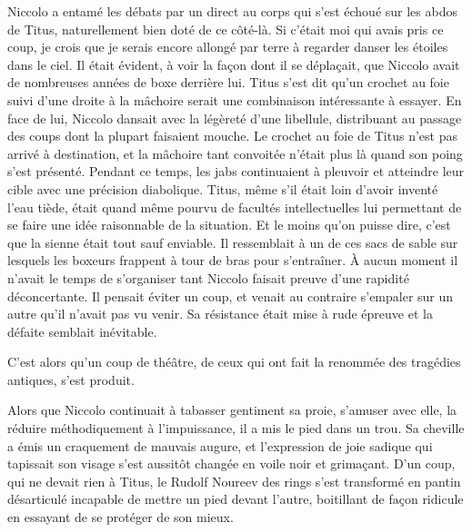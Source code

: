 Niccolo a entamé les débats par un direct au corps qui s’est échoué sur les abdos de Titus, naturellement bien doté de ce côté-là. Si c’était moi qui avais pris ce coup, je crois que je serais encore allongé par terre à regarder danser les étoiles dans le ciel. Il était évident, à voir la façon dont il se déplaçait, que Niccolo avait de nombreuses années de boxe derrière lui. Titus s’est dit qu’un crochet au foie suivi d’une droite à la mâchoire serait une combinaison intéressante à essayer. En face de lui, Niccolo dansait avec la légèreté d’une libellule, distribuant au passage des coups dont la plupart faisaient mouche. Le crochet au foie de Titus n’est pas arrivé à destination, et la mâchoire tant convoitée n’était plus là quand son poing s’est présenté. Pendant ce temps, les jabs continuaient à pleuvoir et atteindre leur cible avec une précision diabolique. Titus, même s’il était loin d’avoir inventé l’eau tiède, était quand même pourvu de facultés intellectuelles lui permettant de se faire une idée raisonnable de la situation. Et le moins qu’on puisse dire, c’est que la sienne était tout sauf enviable. Il ressemblait à un de ces sacs de sable sur lesquels les boxeurs frappent à tour de bras pour s’entraîner. À aucun moment il n’avait le temps de s’organiser tant Niccolo faisait preuve d’une rapidité déconcertante. Il pensait éviter un coup, et venait au contraire s’empaler sur un autre qu’il n’avait pas vu venir. Sa résistance était mise à rude épreuve et la défaite semblait inévitable.

C’est alors qu’un coup de théâtre, de ceux qui ont fait la renommée des tragédies antiques, s’est produit.

Alors que Niccolo continuait à tabasser gentiment sa proie, s’amuser avec elle, la réduire méthodiquement à l’impuissance, il a mis le pied dans un trou. Sa cheville a émis un craquement de mauvais augure, et l’expression de joie sadique qui tapissait son visage s’est aussitôt changée en voile noir et grimaçant. D’un coup, qui ne devait rien à Titus, le Rudolf Noureev des rings s’est transformé en pantin désarticulé incapable de mettre un pied devant l’autre, boitillant de façon ridicule en essayant de se protéger de son mieux.

